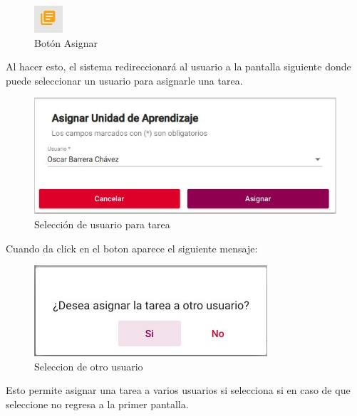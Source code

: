             \begin{figure}[H]
                \centering
                \hypertarget{boton}{\includegraphics[width=0.7\linewidth]{images/Tareas/boton}}
                \caption{Botón Asignar}
                \label{boton}
            \end{figure}

            Al hacer esto, el sistema redireccionará al usuario a la pantalla siguiente donde puede seleccionar un usuario para asignarle una tarea.

            \begin{figure}[H]
                \centering
                \hypertarget{asigna}{\includegraphics[width=0.7\linewidth]{images/Tareas/Asignando}}
                \caption{Selección de usuario para tarea}
                \label{asigna}
            \end{figure}

           Cuando da click en el boton  aparece el siguiente mensaje:
            \begin{figure}[H]
                \centering
                \hypertarget{asignar}{\includegraphics[width=0.7\linewidth]{images/Tareas/Asignarotro}}
                \caption{Seleccion de otro usuario}
                \label{asignar}
            \end{figure}
            Esto permite asignar una tarea a varios usuarios si selecciona si en caso de que seleccione no regresa a la primer pantalla.

